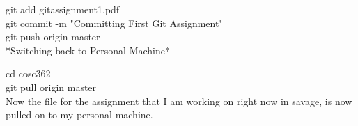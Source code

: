 \documentclass[12pt]{article}
\begin{document}
	git add gitassignment1.pdf\\

	git commit -m "Committing First Git Assignment"\\

	git push origin master\\

*Switching back to Personal Machine*

	 cd cosc362\\

	 git pull origin master\\

Now the file for the assignment that I am working on right now in savage, is now pulled on to my personal machine.
\end{document}
